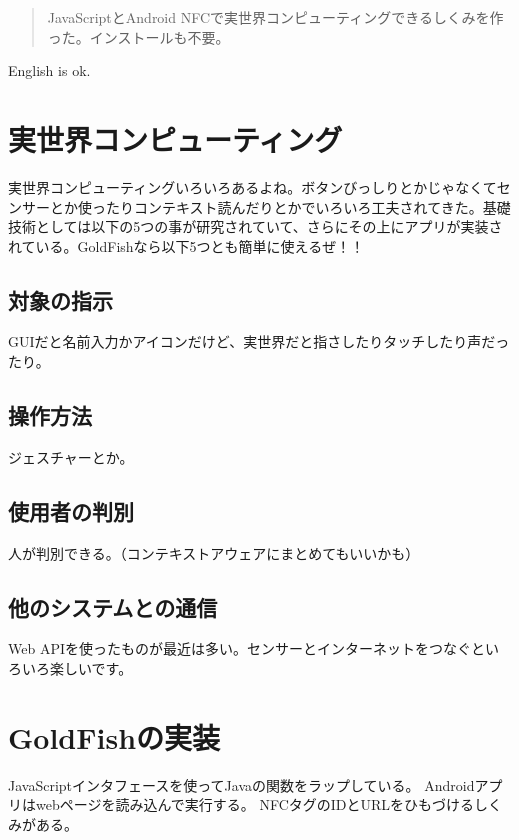 
\begin{abstract}
JavaScriptとAndroid NFCで実世界コンピューティングできるしくみを作った。インストールも不要。
\end{abstract}

\begin{eabstract}
English is ok.
\end{eabstract}

\maketitle

\section{実世界コンピューティング}\label{sec:Introduction}
実世界コンピューティングいろいろあるよね。ボタンびっしりとかじゃなくてセンサーとか使ったりコンテキスト読んだりとかでいろいろ工夫されてきた。基礎技術としては以下の5つの事が研究されていて、さらにその上にアプリが実装されている。GoldFishなら以下5つとも簡単に使えるぜ！！

\subsection{対象の指示}
GUIだと名前入力かアイコンだけど、実世界だと指さしたりタッチしたり声だったり。

\subsection{操作方法}
ジェスチャーとか。

\subsection{使用者の判別}
人が判別できる。（コンテキストアウェアにまとめてもいいかも）

\subsection{他のシステムとの通信}
Web APIを使ったものが最近は多い。センサーとインターネットをつなぐといろいろ楽しいです。

\section{GoldFishの実装}
JavaScriptインタフェースを使ってJavaの関数をラップしている。
Androidアプリはwebページを読み込んで実行する。
NFCタグのIDとURLをひもづけるしくみがある。

